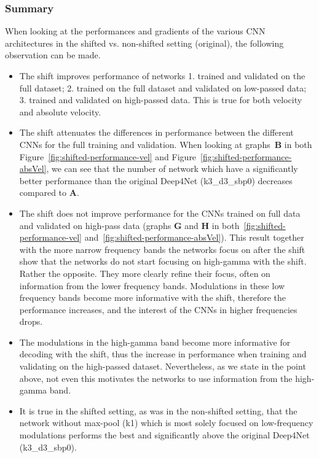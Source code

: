 \subsubsection{Summary}\label{subsubsec:centre-shiftig-summary}
When looking at the performances and gradients of the various CNN architectures in the shifted vs. non-shifted setting (original), the following observation can be made.
\begin{itemize}
    \item The shift improves performance of networks 1. trained and validated on the full dataset; 2. trained on the full dataset and validated on low-passed data;
    3. trained and validated on high-passed data. This is true for both velocity and absolute velocity.
    
    \item The shift attenuates the differences in performance between the different CNNs for the full training and validation.
    When looking at graphs~\textbf{B} in both Figure~\ref{fig:shifted-performance-vel} and Figure~\ref{fig:shifted-performance-absVel}, we can see that the number of network which have a significantly better performance than the original Deep4Net (k3\_d3\_sbp0) decreases compared to \textbf{A}.
    
    \item The shift does not improve performance for the CNNs trained on full data and validated on high-pass data (graphs \textbf{G} and \textbf{H} in both~\ref{fig:shifted-performance-vel} and~\ref{fig:shifted-performance-absVel}).
    This result together with the more narrow frequency bands the networks focus on after the shift show that the networks do not start focusing on high-gamma with the shift.
    Rather the opposite.
    They more clearly refine their focus, often on information from the lower frequency bands.
    Modulations in these low frequency bands become more informative with the shift, therefore the performance increases, and the interest of the CNNs in higher frequencies drops.
    
    \item The modulations in the high-gamma band become more informative for decoding with the shift, thus the increase in performance when training and validating on the high-passed dataset.
    Nevertheless, as we state in the point above, not even this motivates the networks to use information from the high-gamma band.
    
    \item It is true in the shifted setting, as was in the non-shifted setting, that the network without max-pool (k1) which is most solely focused on low-frequency modulations performs the best and significantly above the original Deep4Net (k3\_d3\_sbp0).
    
   
\end{itemize}

